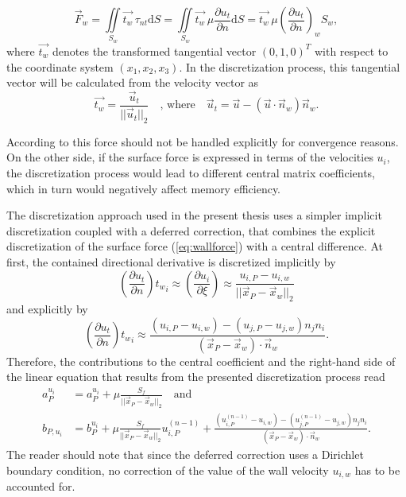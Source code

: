 \begin{equation}
  \label{eq:wallforce}
  \vec{F}_w 
  =  
  \iint\limits_{S_w} \vec{t_w} \, \tau_{nt} \mathrm{d}S
  =
  \iint\limits_{S_w} \vec{t_w} \, \mu \frac{\partial u_t}{\partial n} \mathrm{d}S
  =
  \vec{t_w} \, \mu \left(\frac{\partial u_t}{\partial n}\right)_w S_w,
\end{equation}
where \( \vec{t_w} \) denotes the transformed tangential vector \((0,1,0)^T\) with respect to the coordinate system \((x_1,x_2,x_3)\). In the discretization process, this tangential vector will be calculated from the velocity vector as
\begin{displaymath}
  \vec{t_w} = \frac{\vec{u}_t}{|| \vec{u}_t ||_2} \quad \text{, where} \quad \vec{u}_t = \vec{u} - \left( \vec{u} \cdot \vec{n}_w \right) \vec{n}_w.
\end{displaymath}

According to \cite{ferziger02} this force should not be handled explicitly for convergence reasons. On the other side, if the surface force is expressed in terms of the velocities \(u_i\), the discretization process would lead to different central matrix coefficients, which in turn would negatively affect memory efficiency.

The discretization approach used in the present thesis uses a simpler implicit discretization coupled with a deferred correction, that combines the explicit discretization of the surface force (\ref{eq:wallforce}) with a central difference. At first, the contained directional derivative is discretized implicitly by
\begin{displaymath}
  \left(\frac{\partial u_t}{\partial n}\right) {t_w}_i
  \approx
  \left(\frac{\partial u_i}{\partial \xi}\right)
  \approx
  \frac{u_{i,P} - u_{i,w}}{|| \vec{x}_P - \vec{x}_w ||_2}
\end{displaymath}
and explicitly by
\begin{displaymath}
  \left(\frac{\partial u_t}{\partial n}\right) {t_w}_i
  \approx
  \frac{\left(u_{i,P}- u_{i,w} \right) - \left(u_{j,P} - u_{j,w}\right) n_j n_i  }{\left( \vec{x}_P - \vec{x}_w \right) \cdot \vec{n}_w}.
\end{displaymath}
Therefore, the contributions to the central coefficient and the right-hand side of the linear equation that results from the presented discretization process read
\begin{align*}
  a_P^{u_i} &= a_P^{u_i} + \mu \frac{S_f}{|| \vec{x}_P - \vec{x}_w ||_2} \quad \text{and} \\
  b_{P,u_i} &= b_P^{u_i} + \mu \frac{S_f}{|| \vec{x}_P - \vec{x}_w ||_2} u_{i,P}^{(n-1)} + 
  \frac{\left(u_{i,P}^{(n-1)}- u_{i,w} \right) - \left(u_{j,P}^{(n-1)} - u_{j,w}\right) n_j n_i  }{\left( \vec{x}_P - \vec{x}_w \right) \cdot \vec{n}_w}.
\end{align*}
The reader should note that since the deferred correction uses a Dirichlet boundary condition, no correction of the value of the wall velocity \(u_{i,w}\) has to be accounted for.

